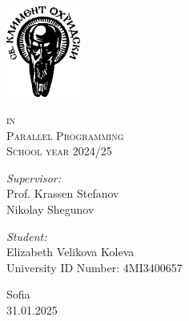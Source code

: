\begin{titlepage}
    \begin{center}
        \vspace*{-2.3cm}
        \includegraphics[height=3cm]{resources/su_logo.png}

        \vspace*{.06\textheight}
        {\scshape\large \univname\par}\vspace{2.5cm}

        {\huge \bfseries{\thetitle}\par}\vspace{0.7cm}
        \textsc{\small in }\\[0.6cm]
        \textsc{\Large Parallel Programming}\\[0.5cm]\vspace{0.5cm}
        \textsc{\normalsize School year 2024/25}\\[0.5cm]\vspace{2cm}


        \begin{minipage}[t]{0.4\textwidth}
            \begin{flushleft} \large
                \emph{Supervisor:}\\[0.7cm]
                Prof. Krassen Stefanov\\[0.7cm]
                Nikolay Shegunov\\[0.4cm]
            \end{flushleft}
        \end{minipage}
        \begin{minipage}[t]{0.4\textwidth}
            \begin{flushright} \large
                \emph{Student:}\\[0.7cm]
                Elizabeth Velikova Koleva \\[0.5cm]
                University ID Number: 4MI3400657 \\[0.4cm]
            \end{flushright}
        \end{minipage}

        \vspace*{.11\textheight}

        Sofia\\[0.2cm]
        {31.01.2025}

    \end{center}
\end{titlepage}